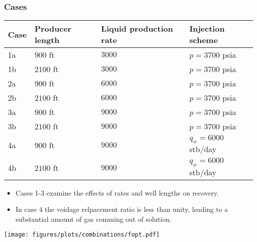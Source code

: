 \documentclass{beamer}
\begin{document}
\begin{frame}
    \frametitle{Cases}
    \footnotesize
    \begin{tabular}{llll}
        \toprule
        \textbf{Case} & \textbf{Producer length} & \textbf{Liquid production rate} & \textbf{Injection scheme} \\
        \midrule
        1a            & $900$ ft                   & $3000$                          & $p = 3700$ psia           \\
        1b            & $2100$ ft                  & $3000$                          & $p = 3700$ psia           \\
        2a            & $900$ ft                   & $6000$                          & $p = 3700$ psia           \\
        2b            & $2100$ ft                  & $6000$                          & $p = 3700$ psia           \\
        3a            & $900$ ft                   & $9000$                          & $p = 3700$ psia           \\
        3b            & $2100$ ft                  & $9000$                          & $p = 3700$ psia           \\
        4a            & $900$ ft                   & $9000$                          & $q_w = 6000$ stb/day      \\
        4b            & $2100$ ft                  & $9000$                          & $q_w = 6000$ stb/day      \\
        \bottomrule
    \end{tabular}
    \normalsize
    \begin{itemize}
        \item Cases 1-3 examine the effects of rates and well lengths on recovery.
        \item In case 4 the voidage relpacement ratio is less than unity, leading to a substantial amount of gas comming out of solution.
    \end{itemize}
\end{frame}


\begin{frame}
    \centerline{
    \texttt{[image: figures/plots/combinations/fopt.pdf]}}
\end{frame}
\end{document}
